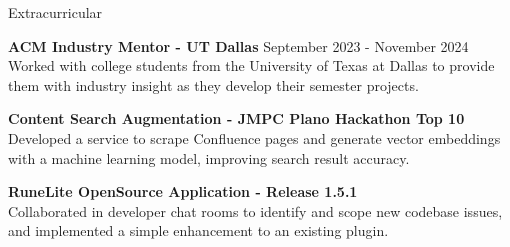 \documentclass[
	10pt, %
]{resume} %
\begin{document}
\begin{rSection}{Extracurricular}
	
    \textbf{ACM Industry Mentor - UT Dallas} \hfill {September 2023 - November 2024} \\ 
    Worked with college students from the University of Texas at Dallas to provide them with industry insight as they
develop their semester projects.

    \textbf{Content Search Augmentation - JMPC Plano Hackathon Top 10} \hfill {} \\ 
    Developed a service to scrape Confluence pages and generate vector embeddings with a machine learning model, improving search result accuracy.
    
    \textbf{RuneLite OpenSource Application - Release 1.5.1} \hfill {} \\ 
    Collaborated in developer chat rooms to identify and scope new codebase issues, and implemented a simple enhancement to an existing plugin.
	
\end{rSection}






\end{document}
